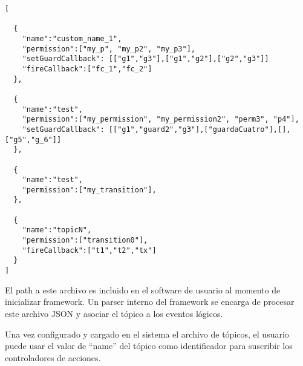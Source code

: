 \begin{verbatim}
[

  {
    "name":"custom_name_1",
    "permission":["my_p", "my_p2", "my_p3"],
    "setGuardCallback": [["g1","g3"],["g1","g2"],["g2","g3"]]
    "fireCallback":["fc_1","fc_2"]
  },
  
  {
    "name":"test",
    "permission":["my_permission", "my_permission2", "perm3", "p4"],
    "setGuardCallback": [["g1","guard2","g3"],["guardaCuatro"],[],["g5","g_6"]] 
  },
  
  {
    "name":"test",
    "permission":["my_transition"],
  },
  
  {
    "name":"topicN",
    "permission":["transition0"],
    "fireCallback":["t1","t2","tx"]
  }
]
\end{verbatim}

El path a este archivo es incluido en el software de usuario al momento de
inicializar \nombreFramework framework. Un parser interno del framework se
encarga de procesar este archivo JSON y asociar el tópico a los eventos
lógicos.

Una vez configurado y cargado en el sistema el archivo de tópicos, el usuario
puede usar el valor de ``name'' del tópico como identificador para suscribir
los controladores de acciones.

